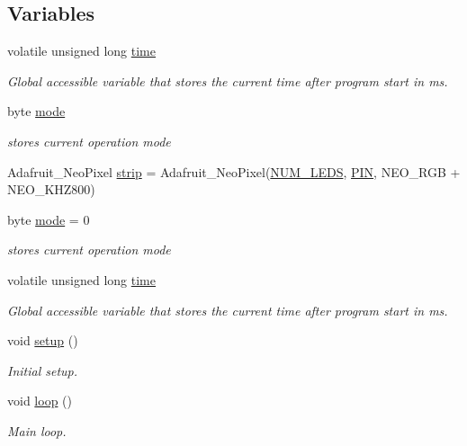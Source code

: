 \subsection*{Variables}
\begin{DoxyCompactItemize}
\item 
volatile unsigned long \hyperlink{group__main_ga4f944bfefd58754546ebcc7c5143442c}{time}
\begin{DoxyCompactList}\small\item\em Global accessible variable that stores the current time after program start in ms. \end{DoxyCompactList}\item 
byte \hyperlink{group__main_ga988166baebc4b27bd18de27cd40f8b5a}{mode}
\begin{DoxyCompactList}\small\item\em stores current operation mode \end{DoxyCompactList}\end{DoxyCompactItemize}
\begin{DoxyCompactItemize}
\item 
Adafruit\+\_\+\+Neo\+Pixel \hyperlink{group__main_gacf2771bd8bfaf855bbcc6c30301bf380}{strip} = Adafruit\+\_\+\+Neo\+Pixel(\hyperlink{group__deployment_ga4c4ae9a4146ce8d6a5debc90300d9abd}{N\+U\+M\+\_\+\+L\+E\+DS}, \hyperlink{group__deployment_gae1a27401b7fb01ccb9a82dbddbb54eea}{P\+IN}, N\+E\+O\+\_\+\+R\+GB + N\+E\+O\+\_\+\+K\+H\+Z800)
\item 
byte \hyperlink{group__main_ga988166baebc4b27bd18de27cd40f8b5a}{mode} = 0
\begin{DoxyCompactList}\small\item\em stores current operation mode \end{DoxyCompactList}\item 
volatile unsigned long \hyperlink{group__main_ga4f944bfefd58754546ebcc7c5143442c}{time}
\begin{DoxyCompactList}\small\item\em Global accessible variable that stores the current time after program start in ms. \end{DoxyCompactList}\item 
void \hyperlink{group__main_ga4fc01d736fe50cf5b977f755b675f11d}{setup} ()
\begin{DoxyCompactList}\small\item\em Initial setup. \end{DoxyCompactList}\item 
void \hyperlink{group__main_gafe461d27b9c48d5921c00d521181f12f}{loop} ()
\begin{DoxyCompactList}\small\item\em Main loop. \end{DoxyCompactList}\end{DoxyCompactItemize}


